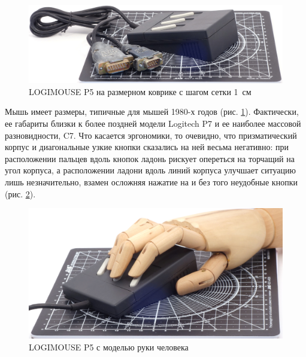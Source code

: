 \documentclass[11pt, a4paper]{article}
\begin{document}
\begin{figure}[h]
    \centering
    \includegraphics[scale=0.5]{1983_logitech_logimouse_p5/size_30.jpg}
    \caption{LOGIMOUSE P5 на размерном коврике с шагом сетки 1~см}
    \label{fig:LogimouseP5Size}
\end{figure}

Мышь имеет размеры, типичные для мышей 1980-х годов (рис. \ref{fig:LogimouseP5Size}). Фактически, ее габариты близки к более поздней модели Logitech P7 и ее наиболее массовой разновидности, C7. Что касается эргономики, то очевидно, что призматический корпус и диагональные узкие кнопки сказались на ней весьма негативно: при расположении пальцев вдоль кнопок ладонь рискует опереться на торчащий на угол корпуса, а расположении ладони вдоль линий корпуса улучшает ситуацию лишь незначительно, взамен осложняя нажатие на и без того неудобные кнопки (рис. \ref{fig:LogimouseP5Hand}).

\begin{figure}[h]
    \centering
    \includegraphics[scale=0.5]{1983_logitech_logimouse_p5/hand_30.jpg}
    \caption{LOGIMOUSE P5 с моделью руки человека}
    \label{fig:LogimouseP5Hand}
\end{figure}
\end{document}
